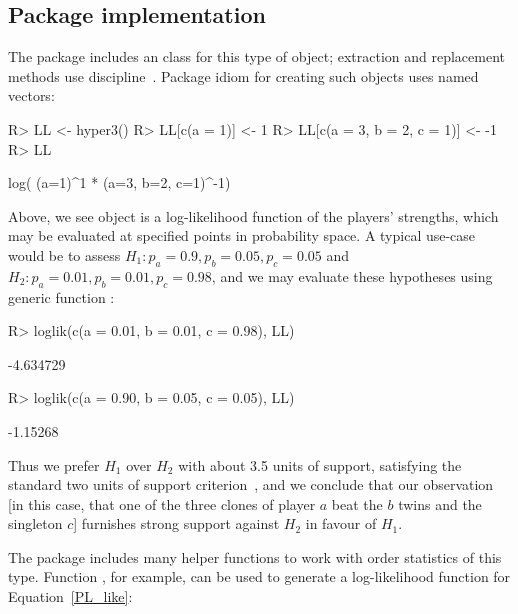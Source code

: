 \documentclass[article]{jss}
\begin{document}
\subsection{Package implementation}

The package includes an  class  for this
type of object; extraction and replacement methods use 
discipline~\citep{hankin2022}.  Package idiom for creating such
objects uses named vectors:

\begin{Schunk}
\begin{Sinput}
R> LL <- hyper3()
R> LL[c(a = 1)] <- 1
R> LL[c(a = 3, b = 2, c = 1)] <- -1
R> LL
\end{Sinput}
\begin{Soutput}
log( (a=1)^1 * (a=3, b=2, c=1)^-1)
\end{Soutput}
\end{Schunk}

Above, we see object  is a log-likelihood function of the
players' strengths, which may be evaluated at specified points in
probability space.  A typical use-case would be to assess $H_1\colon
p_a=0.9,p_b=0.05,p_c=0.05$ and $H_2\colon p_a=0.01,p_b=0.01,p_c=0.98$,
and we may evaluate these hypotheses using generic function
:

\begin{Schunk}
\begin{Sinput}
R> loglik(c(a = 0.01, b = 0.01, c = 0.98), LL)
\end{Sinput}
\begin{Soutput}
[1] -4.634729
\end{Soutput}
\begin{Sinput}
R> loglik(c(a = 0.90, b = 0.05, c = 0.05), LL)
\end{Sinput}
\begin{Soutput}
[1] -1.15268
\end{Soutput}
\end{Schunk}

Thus we prefer $H_1$ over $H_2$ with about 3.5 units of support,
satisfying the standard two units of support
criterion~\citep{edwards1972}, and we conclude that our observation
[in this case, that one of the three clones of player $a$ beat the $b$
twins and the singleton $c$] furnishes strong support against $H_2$ in
favour of $H_1$.

The package includes many helper functions to work with order
statistics of this type.  Function , for
example, can be used to generate a log-likelihood function for
Equation~\ref{PL_like}:
\end{document}

